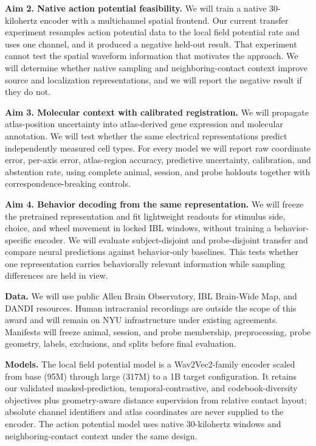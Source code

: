 \documentclass[10pt]{article}
\newcommand{\subheading}[1]{\vspace{3pt}{\normalsize\bfseries\color{nyublue}#1}\par\vspace{1pt}}
\begin{document}
\textbf{Aim 2. Native action potential feasibility.} We will train a native 30-kilohertz encoder with a multichannel spatial frontend. Our current transfer experiment resamples action potential data to the local field potential rate and uses one channel, and it produced a negative held-out result. That experiment cannot test the spatial waveform information that motivates the approach. We will determine whether native sampling and neighboring-contact context improve source and localization representations, and we will report the negative result if they do not.

\textbf{Aim 3. Molecular context with calibrated registration.} We will propagate atlas-position uncertainty into atlas-derived gene expression and molecular annotation. We will test whether the same electrical representations predict independently measured cell types. For every model we will report raw coordinate error, per-axis error, atlas-region accuracy, predictive uncertainty, calibration, and abstention rate, using complete animal, session, and probe holdouts together with correspondence-breaking controls.

\textbf{Aim 4. Behavior decoding from the same representation.} We will freeze the pretrained representation and fit lightweight readouts for stimulus side, choice, and wheel movement in locked IBL windows, without training a behavior-specific encoder. We will evaluate subject-disjoint and probe-disjoint transfer and compare neural predictions against behavior-only baselines. This tests whether one representation carries behaviorally relevant information while sampling differences are held in view.

\subheading{3. Methods, evaluation, and controls}
\textbf{Data.} We will use public Allen Brain Observatory, IBL Brain-Wide Map, and DANDI resources. Human intracranial recordings are outside the scope of this award and will remain on NYU infrastructure under existing agreements. Manifests will freeze animal, session, and probe membership, preprocessing, probe geometry, labels, exclusions, and splits before final evaluation.

\textbf{Models.} The local field potential model is a Wav2Vec2-family encoder scaled from base (95M) through large (317M) to a 1B target configuration. It retains our validated masked-prediction, temporal-contrastive, and codebook-diversity objectives plus geometry-aware distance supervision from relative contact layout; absolute channel identifiers and atlas coordinates are never supplied to the encoder. The action potential model uses native 30-kilohertz windows and neighboring-contact context under the same design.
\end{document}
